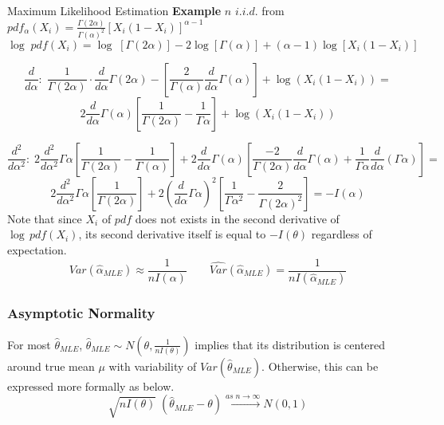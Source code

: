 \documentclass[12pt]{article}
\begin{document}
\begin{section}{Maximum Likelihood Estimation}
\textbf{Example} \quad $n$ $i.i.d.$ from $pdf_\alpha (X_i) = \frac{\Gamma(2\alpha)}{\Gamma(\alpha)^2}[X_i(1-X_i)]^{\alpha -1}$
$$\log\;pdf(X_i) = \log\;[\Gamma(2\alpha)] - 2\log[\Gamma(\alpha)] + (\alpha - 1)\log[X_i(1-X_i)]$$

$$\frac{d}{d\alpha}:\; \frac{1}{\Gamma(2\alpha)} \cdot \frac{d}{d\alpha}\Gamma(2\alpha) - \left[\frac{2}{\Gamma(\alpha)}\frac{d}{d\alpha}\Gamma(\alpha)\right]+\log(X_i(1-X_i)) =$$
$$2\frac{d}{d\alpha}\Gamma(\alpha)\left[\frac{1}{\Gamma(2\alpha)}-\frac{1}{\Gamma\alpha}\right]+\log(X_i(1-X_i))$$

$$\frac{d^2}{d\alpha^2}:\; 2\frac{d^2}{d\alpha^2}\Gamma\alpha[\frac{1}{\Gamma(2\alpha)}-\frac{1}{\Gamma(\alpha)}]+2\frac{d}{d\alpha}\Gamma(\alpha)\left[\frac{-2}{\Gamma(2\alpha)}\frac{d}{d\alpha}\Gamma(\alpha)+\frac{1}{\Gamma\alpha}\frac{d}{d\alpha}(\Gamma\alpha)\right]=$$
$$2\frac{d^2}{d\alpha^2}\Gamma\alpha\left[\frac{1}{\Gamma(2\alpha)}\right] + 2\left(\frac{d}{d\alpha}\Gamma\alpha\right)^2\left[\frac{1}{\Gamma\alpha^2}-\frac{2}{\Gamma(2\alpha)^2}\right] = -I(\alpha)$$
Note that since $X_i$ of $pdf$ does not exists in the second derivative of $\log\,pdf(X_i)$, its second derivative itself is equal to $-I(\theta)$ regardless of expectation.\\
$$Var(\hat{\alpha}_{MLE}) \approx \frac{1}{nI(\alpha)} \qquad \widehat{Var}(\hat{\alpha}_{MLE}) = \frac{1}{nI(\hat{\alpha}_{MLE})}$$

\subsubsection{Asymptotic Normality}
For most $\hat{\theta}_{MLE}$, $\hat{\theta}_{MLE} \sim N(\theta, \frac{1}{nI(\theta)})$ implies that its distribution is centered around true mean $\mu$ with variability of $Var(\hat{\theta}_{MLE})$. Otherwise, this can be expressed more formally as below.
$$\sqrt{nI(\theta)}\;(\hat{\theta}_{MLE}-\theta)  \xrightarrow{as\; n \rightarrow \infty} N(0,1)$$


\end{section}
\end{document}
